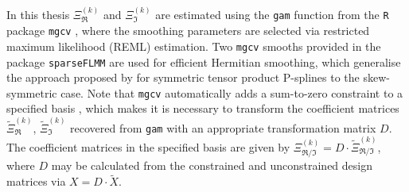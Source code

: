 In this thesis  $\Xi^{(k)}_\Re$ and $\Xi^{(k)}_\Im$ are estimated using the \texttt{gam} function from the \texttt{R} package \texttt{mgcv} \parencite{Wood2017}, where the smoothing parameters are selected via restricted maximum likelihood (REML) estimation.
Two \texttt{mgcv} smooths provided in the package \texttt{sparseFLMM} \parencite{sparseFLMM} are used for efficient Hermitian smoothing, which generalise the approach proposed by \cite{CederbaumScheiplGreven2018} for symmetric tensor product P-splines to the skew-symmetric case.
Note that \texttt{mgcv} automatically adds a sum-to-zero constraint to a specified basis \parencite[see][175]{Wood2017}, which makes it is necessary to transform the coefficient matrices $\widetilde \Xi_\Re^{(k)}$, $\widetilde \Xi_\Im^{(k)}$ recovered from \texttt{gam} with an appropriate transformation matrix $D$.
The coefficient matrices in the specified basis are given by $\Xi_{\Re/\Im}^{(k)} = D \cdot \widetilde \Xi_ {\Re/\Im}^{(k)}$, where $D$ may be calculated from the constrained and unconstrained design matrices via $X = D \cdot \widetilde X$.

